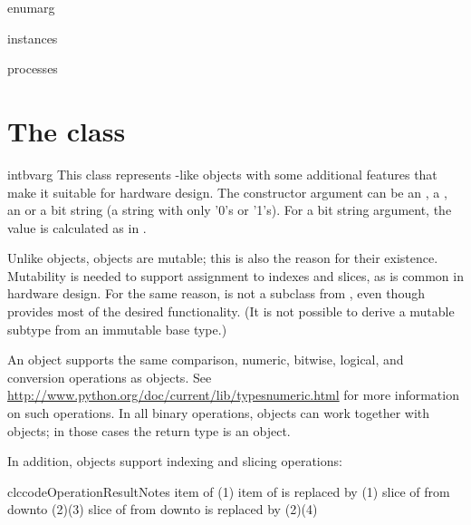 \begin{funcdesc}{enum}{arg }

\end{funcdesc}

\begin{funcdesc}{instances}{}

\end{funcdesc}

\begin{funcdesc}{processes}{}

\end{funcdesc}



\section{The  class \label{ref-intbv}}

\begin{classdesc}{intbv}{arg}
This class represents -like objects with some additional
features that make it suitable for hardware design. The constructor
argument can be an , a , an  or a
bit string (a string with only '0's or '1's). For a bit string
argument, the value is calculated as in . 
\end{classdesc}

Unlike  objects,  objects are mutable; this is
also the reason for their existence. Mutability is needed to support
assignment to indexes and slices, as is common in hardware design. For
the same reason,  is not a subclass from ,
even though  provides most of the desired
functionality. (It is not possible to derive a mutable subtype from
an immutable base type.)

An  object supports the same comparison, numeric,
bitwise, logical, and conversion operations as  objects. See
\url{http://www.python.org/doc/current/lib/typesnumeric.html} for more
information on such operations. In all binary operations,
 objects can work together with  objects; in
those cases the return type is an  object.

In addition,  objects support indexing and slicing
operations:

\begin{tableiii}{clc}{code}{Operation}{Result}{Notes}
	  {item  of }
	  {(1)}
	  {item  of  is replaced by } 
          {(1)}
          {slice of  from  downto } 
          {(2)(3)}
  	  {slice of  from  downto  is replaced
          by } 
          {(2)(4)}
\end{tableiii}

